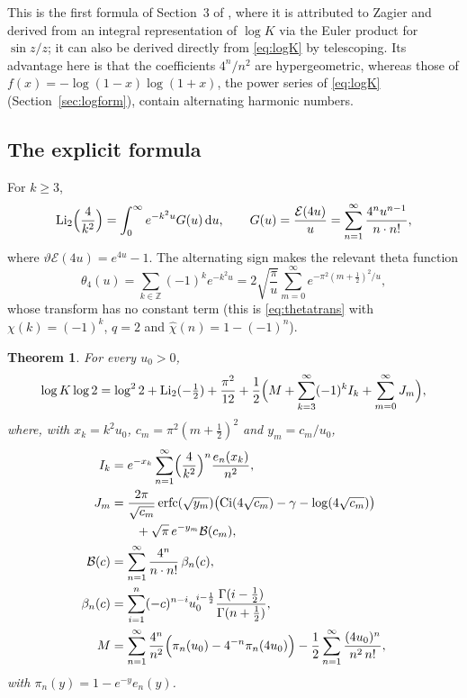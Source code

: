 \documentclass[11pt]{amsart}
\newtheorem{theorem}{Theorem}[section]
\theoremstyle{definition}
\theoremstyle{remark}
\newcommand{\Eip}{\mathcal{E}}
\newcommand{\erfc}{\operatorname{erfc}}
\newcommand{\Ci}{\operatorname{Ci}}
\newcommand{\Li}{\operatorname{Li}}
\newcommand{\dd}{\,\mathrm{d}}
\newcommand{\ZZ}{\mathbb{Z}}
\begin{document}
This is the first formula of Section~3 of \cite{BBC97}, where it is attributed to Zagier and derived from an
integral representation of $\log K$ via the Euler product for $\sin z/z$; it can also be derived directly from
\eqref{eq:logK} by telescoping. Its advantage here is that the coefficients $4^n/n^2$ are hypergeometric, whereas
those of $f(x) = -\log(1-x)\log(1+x)$, the power series of \eqref{eq:logK} (Section~\ref{sec:logform}), contain
alternating harmonic numbers.

\subsection{The explicit formula}

For $k \ge 3$,
\[
  \Li_2\Bigl(\frac4{k^2}\Bigr) = \int_0^\infty e^{-k^2u} G(u)\dd u, \qquad
  G(u) = \frac{\Eip(4u)}{u} = \sum_{n=1}^{\infty}\frac{4^nu^{n-1}}{n\cdot n!},
\]
where $\vartheta\Eip(4u) = e^{4u} - 1$.
The alternating sign makes the relevant theta function
\[
  \theta_4(u) = \sum_{k\in\ZZ}(-1)^ke^{-k^2u} = 2\sqrt{\frac{\pi}{u}}\sum_{m=0}^{\infty}e^{-\pi^2(m+\frac12)^2/u},
\]
whose transform has no constant term (this is
\eqref{eq:thetatrans} with $\chi(k) = (-1)^k$, $q = 2$ and $\hat\chi(n) = 1 - (-1)^n$).

\begin{theorem}\label{thm:khinchin}
For every $u_0 > 0$,
\[
  \log K\log 2 = \log^2 2 + \Li_2(-\tfrac12) + \frac{\pi^2}{12} + \frac12\Bigl(M + \sum_{k=3}^{\infty}(-1)^kI_k + \sum_{m=0}^{\infty}J_m\Bigr),
\]
where, with $x_k = k^2u_0$, $c_m = \pi^2(m+\frac12)^2$ and $y_m = c_m/u_0$,
\begin{align*}
  I_k &= e^{-x_k}\sum_{n=1}^{\infty}\Bigl(\frac{4}{k^2}\Bigr)^n\frac{e_n(x_k)}{n^2}, \\
  J_m &= \frac{2\pi}{\sqrt{c_m}}\erfc(\sqrt{y_m})\bigl(\Ci(4\sqrt{c_m}) - \gamma - \log(4\sqrt{c_m})\bigr) \\
      &\qquad + \sqrt\pi\, e^{-y_m}\mathcal B(c_m), \\
  \mathcal B(c) &= \sum_{n=1}^{\infty}\frac{4^n}{n\cdot n!}\,\beta_n(c), \\
  \beta_n(c) &= \sum_{i=1}^{n}(-c)^{n-i}u_0^{i-\frac12}\frac{\Gamma(i-\frac12)}{\Gamma(n+\frac12)}, \\
  M &= \sum_{n=1}^{\infty}\frac{4^n}{n^2}\Bigl(\pi_n(u_0) - 4^{-n}\pi_n(4u_0)\Bigr) - \frac12\sum_{n=1}^{\infty}\frac{(4u_0)^n}{n^2\,n!},
\end{align*}
with $\pi_n(y) = 1 - e^{-y}e_n(y)$.
\end{theorem}
\end{document}
